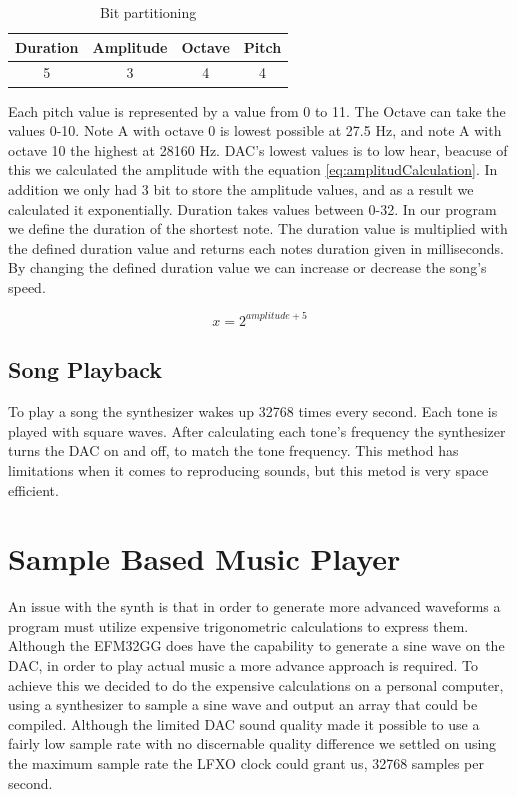 \begin{table}[H]
	\begin{center}
	\begin{tabular}{ |c|c|c|c| }
	  \hline
	  Duration & Amplitude & Octave & Pitch \\
	  \hline
	  5 & 3 & 4 & 4 \\
	  \hline

	\end{tabular}
	\caption{Bit partitioning}
	\label{tab:bitFields}
	\end{center}
\end{table}

Each pitch value is represented by a value from 0 to 11. The Octave can take the values 0-10. Note A with octave 0 is lowest possible at 27.5 Hz, and note A with octave 10 the highest at 28160 Hz. DAC's lowest values is to low hear, beacuse of this we calculated the amplitude with the equation \ref{eq:amplitudCalculation}. In addition we only had 3 bit to store the amplitude values, and as a result we calculated it exponentially. Duration takes values between 0-32. In our program we define the duration of the shortest note. The duration value is multiplied with the defined duration value and returns each notes duration given in milliseconds. By changing the defined duration value we can increase or decrease the song's speed.

\begin{equation}
  x = 2^{amplitude + 5}
  \label{eq:amplitudCalculation}
\end{equation}

\subsection{Song Playback}
To play a song the synthesizer wakes up 32768 times every second. Each tone is played with square waves. After calculating each tone's frequency the synthesizer turns the DAC on and off, to match the tone frequency. This method has limitations when it comes to reproducing sounds, but this metod is very space efficient.

\section{Sample Based Music Player}\label{sec:sample-based-music-player}
An issue with the synth is that in order to generate more advanced waveforms a program must utilize expensive trigonometric calculations to express them. Although the EFM32GG does have the capability to generate a sine wave on the DAC, in order to play actual music a more advance approach is required. To achieve this we decided to do the expensive calculations on a personal computer, using a synthesizer to sample a sine wave and output an array that could be compiled. Although the limited DAC sound quality made it possible to use a fairly low sample rate with no discernable quality difference we settled on using the maximum sample rate the LFXO clock could grant us, 32768 samples per second. 

